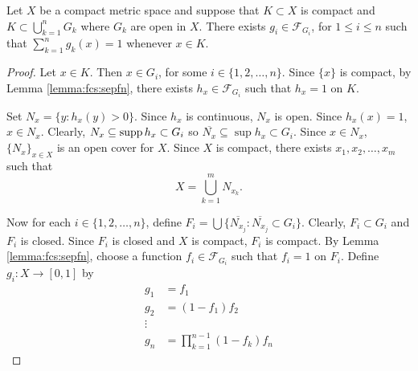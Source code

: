 \begin{lemma}
\label{lemma:fcs:partsunity}
Let $X$ be a compact metric space and suppose that $K \subset X$ is compact and $K \subset \bigcup_{k=1}^n G_k$ where $G_k$ are open in $X$. There exists $g_i \in \mathcal{F}_{G_i}$, for $1 \leq i \leq n$ such that $\sum_{k = 1}^{n} g_k(x) = 1$ whenever $x \in K$.
\end{lemma}
\begin{proof}
Let $x \in K$. Then $x \in G_i$, for some $i \in \{1,2,\ldots, n\}$. Since $\{ x \}$ is compact, by Lemma \ref{lemma:fcs:sepfn}, there exists $h_{x} \in \mathcal{F}_{G_i}$ such that $h_x = 1$ on $K$.

Set $N_x = \{ y : h_x(y) > 0 \}$. Since $h_{x}$ is continuous, $N_x$ is open. Since $h_x(x) = 1$, $x \in N_x$. Clearly, $N_x \subseteq \operatorname{supp} h_x \subset G_i$ so $\overline{N_x} \subseteq \sup h_x \subset G_i$. Since $x \in N_x$, $\{ N_x \}_{x \in X}$ is an open cover for $X$. Since $X$ is compact, there exists $x_1, x_2, \ldots , x_m$ such that \begin{equation}
     \label{eqn:fcs:partsunit:x}
     X = \bigcup_{k = 1}^m N_{x_k}.
\end{equation}

Now for each $i \in \{1,2,\ldots,n\}$, define $F_i = \bigcup \{ \overline{N_{x_j}} : \overline{N_{x_j}} \subset G_i \}$. Clearly, $F_i \subset G_i$ and $F_i$ is closed. Since $F_i$ is closed and $X$ is compact, $F_i$ is compact. By Lemma \ref{lemma:fcs:sepfn}, choose a function $f_i \in \mathcal{F}_{G_i}$ such that $f_i = 1$ on $F_i$. Define $g_i : X \to [0,1]$ by \begin{align*}
    g_1 &= f_1 \\
    g_2 &= (1 - f_1) f_2 \\
    \vdots & \\
    g_n &= \prod_{k = 1}^{n - 1} (1 - f_k) f_n
\end{align*}


\end{proof}
